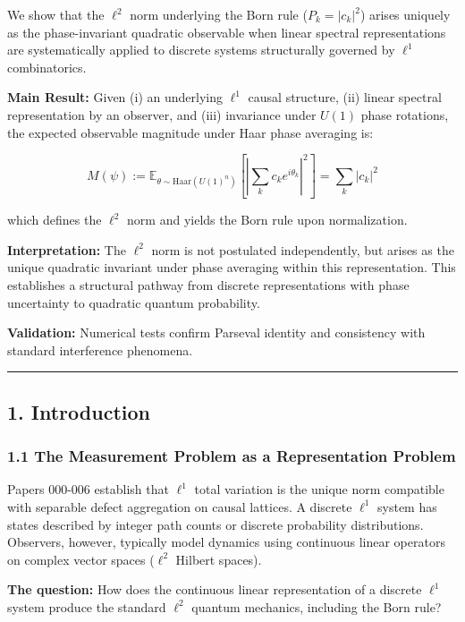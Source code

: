 \documentclass[
]{article}
\begin{document}
We show that the \(\ell^2\) norm underlying the Born rule
(\(P_k = |c_k|^2\)) arises uniquely as the phase-invariant quadratic
observable when linear spectral representations are systematically
applied to discrete systems structurally governed by \(\ell^1\)
combinatorics.

\textbf{Main Result:} Given (i) an underlying \(\ell^1\) causal
structure, (ii) linear spectral representation by an observer, and (iii)
invariance under \(U(1)\) phase rotations, the expected observable
magnitude under Haar phase averaging is:

\[ M(\psi) := \mathbb{E}_{\theta \sim \text{Haar}(U(1)^n)} \left[ \left| \sum_k c_k e^{i\theta_k} \right|^2 \right] = \sum_k |c_k|^2 \]

which defines the \(\ell^2\) norm and yields the Born rule upon
normalization.

\textbf{Interpretation:} The \(\ell^2\) norm is not postulated
independently, but arises as the unique quadratic invariant under phase
averaging within this representation. This establishes a structural
pathway from discrete representations with phase uncertainty to
quadratic quantum probability.

\textbf{Validation:} Numerical tests confirm Parseval identity and
consistency with standard interference phenomena.

\begin{center}\rule{0.5\linewidth}{0.5pt}\end{center}

\subsection{1. Introduction}\label{introduction}

\subsubsection{1.1 The Measurement Problem as a Representation
Problem}\label{the-measurement-problem-as-a-representation-problem}

Papers 000-006 establish that \(\ell^1\) total variation is the unique
norm compatible with separable defect aggregation on causal lattices. A
discrete \(\ell^1\) system has states described by integer path counts
or discrete probability distributions. Observers, however, typically
model dynamics using continuous linear operators on complex vector
spaces (\(\ell^2\) Hilbert spaces).

\textbf{The question:} How does the continuous linear representation of
a discrete \(\ell^1\) system produce the standard \(\ell^2\) quantum
mechanics, including the Born rule?
\end{document}
